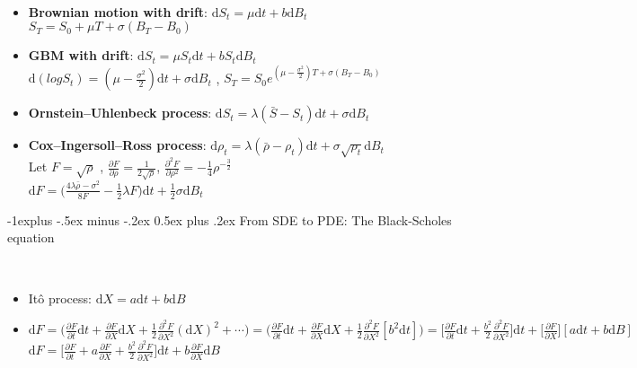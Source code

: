 \documentclass[10pt,landscape,a4paper]{article}
\makeatletter
\renewcommand{\subsection}{\@startsection{subsection}{2}{0mm}%
                                {-1explus -.5ex minus -.2ex}%
                                {0.5ex plus .2ex}%
                                {\normalfont\normalsize\bfseries}}
\makeatother
\begin{document}
\begin{multicols*}{3}
\begin{description}[topsep=0pt]
	\item[It\^{o} processes] ~
	\begin{itemize}[topsep=0pt]
		\item \textbf{Brownian motion with drift}: $\text{d}S_t = \mu \text{d}t+b \text{d}B_t$ \\
		   $S_T = S_0 + \mu T + \sigma (B_T-B_0)$ 
		\item \textbf{GBM with drift}:  $\text{d}S_t = \mu S_t \text{d}t+b S_t \text{d}B_t$ \\
		   $\text{d}(log S_t)=(\mu-\frac{\sigma^2}{2}) \text{d}t + \sigma \text{d}B_t$ ,  $S_T = S_0 e^{(\mu -\frac{\sigma^2}{2})T + \sigma (B_T-B_0)}  $
		\item \textbf{Ornstein–Uhlenbeck process}:  $\text{d}S_t = \lambda (\bar{S} -S_t) \text{d}t + \sigma \text{d}B_t$
		\item \textbf{Cox–Ingersoll–Ross process}:  $ \text{d} \rho_t = \lambda ( \bar{\rho} - \rho_t) \text{d}t + \sigma \sqrt{\rho_t} \text{d} B_t$ \\
		   Let $F=\sqrt{\rho}$ , $\frac{\partial F}{\partial \rho} = \frac{1}{2\sqrt{\rho}}$, $\frac{\partial^2F}{\partial \rho^2} = - \frac{1}{4} \rho ^{-\frac{3}{2}}$ \\
		   $ \text{d}F = \Big( \frac{4 \lambda \bar{\rho} - \sigma^2}{8F} - \frac{1}{2} \lambda F \Big) \text{d}t + \frac{1}{2} \sigma \text{d}B_t$
		
		
	\end{itemize}
\end{description}

\subsection{From SDE to PDE: The Black-Scholes equation}

\begin{description}[topsep=0pt]
	\item[Black-Scholes equation] ~
	\begin{itemize}[topsep=0pt]
		\item It\^{o} process: $\text{d}X = a \text{d}t+b \text{d}B$\
		\item $\text{d}F=\Big( \frac{\partial F}{\partial t}\text{d}t + \frac{\partial F}{\partial X} \text{d}X + \frac{1}{2} \frac{\partial^2 F}{\partial X^2} (\text{d}X)^2 + \cdots \Big) = \Big( \frac{\partial F}{\partial t}\text{d}t + \frac{\partial F}{\partial X} \text{d}X + \frac{1}{2} \frac{\partial^2 F}{\partial X^2} [b^2 \text{d}t] \Big) = \Big[ \frac{\partial F}{\partial t}\text{d}t + \frac{b^2}{2} \frac{\partial^2 F}{\partial X^2} \Big] \text{d}t + \Big[\frac{\partial F}{\partial X}\Big]  [ a \text{d}t+b \text{d}B]$ \\
		$\text{d}F = \Big[ \frac{\partial F}{\partial t} +a \frac{\partial F}{\partial X} + \frac{b^2}{2} \frac{\partial^2 F}{\partial X^2} \Big] \text{d}t + b \frac{\partial F}{\partial X} \text{d}B  $
		

\end{itemize}
\end{description}
\end{multicols*}
\end{document}
